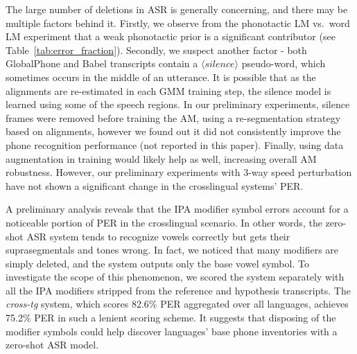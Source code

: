 \documentclass{article}
\begin{document}
The large number of deletions in ASR is generally concerning, and there may be multiple factors behind it. Firstly, we observe from the phonotactic LM vs.~word LM experiment that a weak phonotactic prior is a significant contributor (see Table~\ref{tab:error_fraction}). 
Secondly, we suspect another factor - both GlobalPhone and Babel transcripts contain a $\langle silence \rangle$ pseudo-word, which sometimes occurs in the middle of an utterance. It is possible that as the alignments are re-estimated in each GMM training step, the silence model is learned using some of the speech regions. 
In our preliminary experiments, silence frames were removed before training the AM, using a re-segmentation strategy based on alignments, however we found out it did not consistently improve the phone recognition performance (not reported in this paper).
Finally, using data augmentation in training would likely help as well, increasing overall AM robustness. However, our preliminary experiments with 3-way speed perturbation \cite{ko2015audio} have not shown a significant change in the crosslingual systems' PER.

A preliminary analysis reveals that the IPA modifier symbol errors account for a noticeable portion of PER in the crosslingual scenario. In other words, the zero-shot ASR system tends to recognize vowels correctly but gets their suprasegmentals and tones wrong. In fact, we noticed that many modifiers are simply deleted, and the system outputs only the base vowel symbol. To investigate the scope of this phenomenon, we scored the system separately with all the IPA modifiers stripped from the reference and hypothesis transcripts. The \emph{cross-tg} system, which scores 82.6\% PER aggregated over all languages, achieves 75.2\% PER in such a lenient scoring scheme. It suggests that disposing of the modifier symbols could help discover languages' base phone inventories with a zero-shot ASR model.
\end{document}
